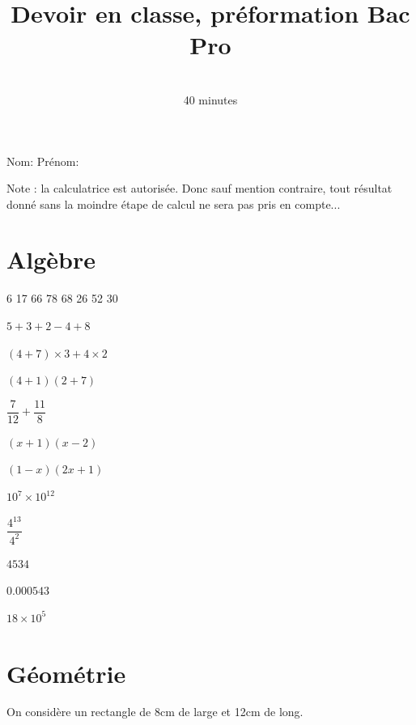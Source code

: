 \documentclass[a4paper,12pt]{scrartcl}
\date{}
\title{Devoir en classe, préformation Bac Pro}
\author{\rotatebox{10}{\textsc{Mathématiques}} \\ 40 minutes}
\begin{document}
\maketitle

{\Large Nom:} 
\hspace{60mm}
{\Large Prénom:}
\vspace{6mm}

Note : la calculatrice est autorisée. Donc sauf mention contraire, tout résultat donné sans la moindre étape de calcul ne sera pas pris en compte...

\section*{Algèbre}


6 17 66 78 68 26 52 30



\question{}
$5+3+2-4+8$


\question{}
$(4+7) \times 3 + 4 \times 2$

\question{}
$(4+1)(2+7)$

$\dfrac{7}{12} + \dfrac{11}{8}$


\question{}$(x+1)(x-2)$

\question{}
$(1-x)(2x+1)$


\question{}
$10^{7} \times 10^{12}$

\question{}
$\dfrac{4^{13}}{4^{2}}$


\question{}
$4534$

\question{}
$0.000543$

\question{}
$18 \times 10^{5}$

\section*{Géométrie}

On considère un rectangle de 8cm de large et 12cm de long.
\end{document}

